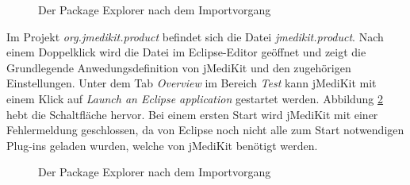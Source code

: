 \begin{figure}[H]
  \vspace{0.5cm}
  \centering
  \caption{Der Package Explorer nach dem Importvorgang}
  \label{finishedimport}
  \vspace{0.5cm}
\end{figure}

Im Projekt \textit{org.jmedikit.product} befindet sich die Datei \textit{jmedikit.product}. Nach einem Doppelklick wird die Datei im Eclipse-Editor geöffnet und zeigt die Grundlegende Anwedungsdefinition von jMediKit und den zugehörigen Einstellungen. Unter dem Tab \textit{Overview} im Bereich \textit{Test} kann jMediKit mit einem Klick auf \textit{Launch an Eclipse application} gestartet werden. Abbildung \ref{launchjmedikit} hebt die Schaltfläche hervor. Bei einem ersten Start wird jMediKit mit einer Fehlermeldung geschlossen, da von Eclipse noch nicht alle zum Start notwendigen Plug-ins geladen wurden, welche von jMediKit benötigt werden.

\begin{figure}[H]
  \vspace{0.5cm}
  \centering
  \caption{Der Package Explorer nach dem Importvorgang}
  \label{launchjmedikit}
  \vspace{0.5cm}
\end{figure}


